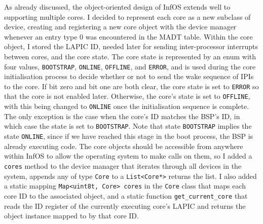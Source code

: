 \documentclass[bsc,frontabs,singlespacing,parskip,deptreport]{infthesis}
\begin{document}
As already discussed, the object-oriented design of InfOS extends well to supporting multiple cores. I decided to represent each core as a new subclass of device, creating and registering a new core object with the device manager whenever an entry type 0 was encountered in the MADT table. Within the core object, I stored the LAPIC ID, needed later for sending inter-processor interrupts between cores, and the core state. The core state is represented by an enum with four values, \verb|BOOTSTRAP|, \verb|ONLINE|, \verb|OFFLINE|, and \verb|ERROR|, and is used during the core initialisation process to decide whether or not to send the wake sequence of IPIs to the core. If bit zero and bit one are both clear, the core state is set to \verb|ERROR| so that the core is not enabled later. Otherwise, the core's state is set to \verb|OFFLINE|, with this being changed to \verb|ONLINE| once the initialisation sequence is complete. The only exception is the case when the core's ID matches the BSP's ID, in which case the state is set to \verb|BOOTSTRAP|. Note that state \verb|BOOTSTRAP| implies the state \verb|ONLINE|, since if we have reached this stage in the boot process, the BSP is already executing code. The core objects should be accessible from anywhere within InfOS to allow the operating system to make calls on them, so I added a \verb|cores| method to the device manager that iterates through all devices in the system, appends any of type \verb|Core| to a \verb|List<Core*>| returns the list. I also added a static mapping \verb|Map<uint8t, Core> cores| in the \verb|Core| class that maps each core ID to the associated object, and a static function \verb|get_current_core| that reads the ID register of the currently executing core's LAPIC and returns the object instance mapped to by that core ID.
\end{document}
